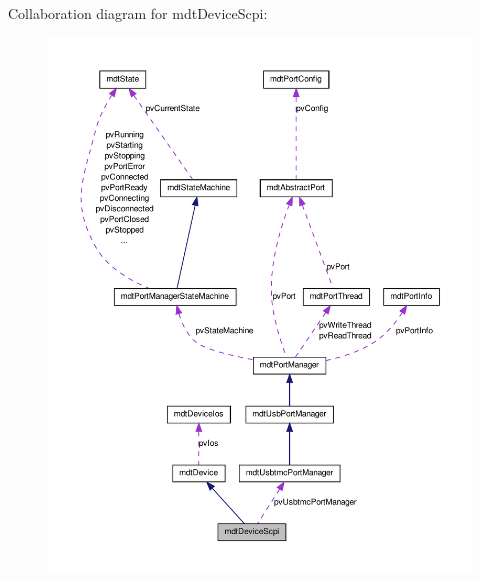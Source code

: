 Collaboration diagram for mdtDeviceScpi:
\nopagebreak
\begin{figure}[H]
\begin{center}
\leavevmode
\includegraphics[width=400pt]{classmdt_device_scpi__coll__graph}
\end{center}
\end{figure}
